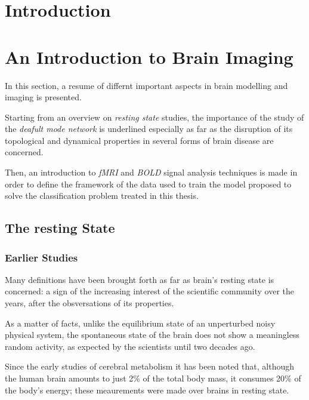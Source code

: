 \documentclass[12pt,openright,twoside,a4paper]{book}
\begin{document}
\frontmatter

\tableofcontents

\chapter{Introduction}

\mainmatter

\chapter{An Introduction to Brain Imaging}

In this section, a resume of differnt important aspects in brain modelling and imaging is presented.

Starting from an overview on \textit{resting state} studies, the importance of the study of the \textit{deafult mode network} is underlined especially as far as the disruption of its topological and dynamical properties in several forms of brain disease are concerned.

Then, an introduction to \textit{fMRI} and \textit{BOLD} signal analysis techniques is made in order to define the framework of the data used to train the model proposed to solve the classification problem treated in this thesis. 

\section{The resting State}

\subsection{Earlier Studies}

Many definitions have been brought forth as far as brain's resting state is concerned: a sign of the increasing interest of the scientific community over the years, after the obsversations of its properties.

As a matter of facts, unlike the equilibrium state of an unperturbed noisy physical system, the spontaneous state of the brain does not show a meaningless random activity, as expected by the scientists until two decades ago.

Since the early studies of cerebral metabolism it has been noted that, although the human brain amounts to just 2\% of the total body mass, it consumes 20\% of the body's energy; these meaurements were made over brains in resting state.
\vspace{5mm}
\end{document}

